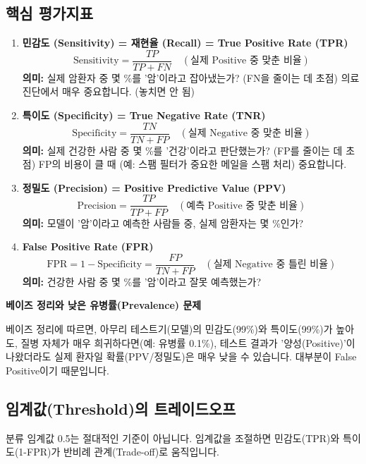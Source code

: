 \documentclass[11pt,a4paper]{book}
\theoremstyle{definition}
\begin{document}
\subsection{핵심 평가지표}

\begin{enumerate}
  \item \textbf{민감도 (Sensitivity) = 재현율 (Recall) = True Positive Rate (TPR)}
      $$ \text{Sensitivity} = \frac{TP}{TP + FN} \quad (\text{실제 Positive 중 맞춘 비율}) $$
      \textbf{의미:} 실제 암환자 중 몇 \%를 '암'이라고 잡아냈는가? (FN을 줄이는 데 초점)
      의료 진단에서 매우 중요합니다. (놓치면 안 됨)

  \item \textbf{특이도 (Specificity) = True Negative Rate (TNR)}
      $$ \text{Specificity} = \frac{TN}{TN + FP} \quad (\text{실제 Negative 중 맞춘 비율}) $$
      \textbf{의미:} 실제 건강한 사람 중 몇 \%를 '건강'이라고 판단했는가? (FP를 줄이는 데 초점)
      FP의 비용이 클 때 (예: 스팸 필터가 중요한 메일을 스팸 처리) 중요합니다.

  \item \textbf{정밀도 (Precision) = Positive Predictive Value (PPV)}
      $$ \text{Precision} = \frac{TP}{TP + FP} \quad (\text{예측 Positive 중 맞춘 비율}) $$
      \textbf{의미:} 모델이 '암'이라고 예측한 사람들 중, 실제 암환자는 몇 \%인가?

  \item \textbf{False Positive Rate (FPR)}
      $$ \text{FPR} = 1 - \text{Specificity} = \frac{FP}{TN + FP} \quad (\text{실제 Negative 중 틀린 비율}) $$
      \textbf{의미:} 건강한 사람 중 몇 \%를 '암'이라고 잘못 예측했는가?
\end{enumerate}

\begin{warningbox}
  \textbf{베이즈 정리와 낮은 유병률(Prevalence) 문제}

  베이즈 정리에 따르면, 아무리 테스트기(모델)의 민감도(99\%)와 특이도(99\%)가 높아도,
  질병 자체가 매우 희귀하다면(예: 유병률 0.1\%),
  테스트 결과가 '양성(Positive)'이 나왔더라도 실제 환자일 확률(PPV/정밀도)은 매우 낮을 수 있습니다.
  대부분이 False Positive이기 때문입니다.
\end{warningbox}


\subsection{임계값(Threshold)의 트레이드오프}

분류 임계값 0.5는 절대적인 기준이 아닙니다.
임계값을 조절하면 민감도(TPR)와 특이도(1-FPR)가 반비례 관계(Trade-off)로 움직입니다.
\end{document}
